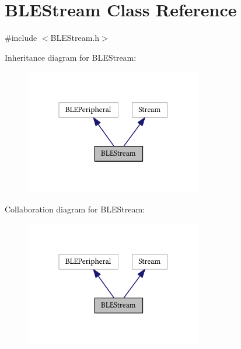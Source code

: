 \hypertarget{class_b_l_e_stream}{}\section{B\+L\+E\+Stream Class Reference}
\label{class_b_l_e_stream}


{\ttfamily \#include $<$B\+L\+E\+Stream.\+h$>$}



Inheritance diagram for B\+L\+E\+Stream\+:\nopagebreak
\begin{figure}[H]
\begin{center}
\leavevmode
\includegraphics[width=220pt]{class_b_l_e_stream__inherit__graph}
\end{center}
\end{figure}


Collaboration diagram for B\+L\+E\+Stream\+:\nopagebreak
\begin{figure}[H]
\begin{center}
\leavevmode
\includegraphics[width=220pt]{class_b_l_e_stream__coll__graph}
\end{center}
\end{figure}
